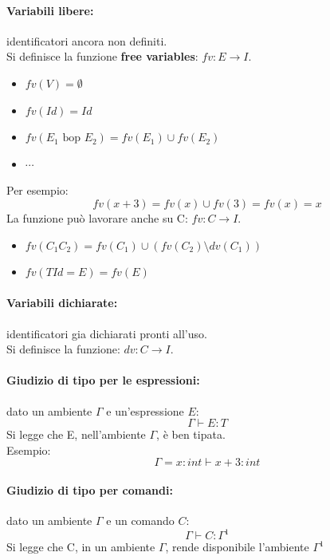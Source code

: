 \documentclass[a4paper,12pt]{article}
\begin{document}
\paragraph{Variabili libere: } identificatori ancora non definiti.\\
Si definisce la funzione \textbf{free variables}: $fv: E \rightarrow I$.
\begin{itemize}
  \item $fv(V) = \emptyset$
  \item $fv(Id) = {Id}$
  \item $fv(E_1 \text{ bop } E_2) = fv(E_1) \cup fv(E_2)$
  \item $\cdots$
\end{itemize}
Per esempio:
\[
fv(x + 3) = fv(x) \cup fv(3) = fv(x) = {x}
\]
La funzione può lavorare anche su C: $fv: C \rightarrow I$.
\begin{itemize}
  \item $fv(C_1 C_2) = fv(C_1) \cup (fv(C_2) \setminus dv(C_1))$
  \item $fv(T Id = E) = fv(E)$
\end{itemize}

\paragraph{Variabili dichiarate: } identificatori gia dichiarati pronti all'uso.\\
Si definisce la funzione: $dv: C \rightarrow I$.\\

\paragraph{Giudizio di tipo per le espressioni: } dato un ambiente $\Gamma$ e un'espressione $E$:
\[
\Gamma \vdash E : T
\]
Si legge che E, nell'ambiente $\Gamma$, è ben tipata.\\
Esempio:
\[
\Gamma = {x: int} \vdash x+3 : int
\]

\paragraph{Giudizio di tipo per comandi: } dato un ambiente $\Gamma$ e un comando $C$:
\[
\Gamma \vdash C : \Gamma^1
\]
Si legge che C, in un ambiente $\Gamma$, rende disponibile l'ambiente $\Gamma^1$
\end{document}
